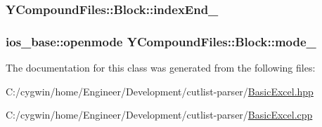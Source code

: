 \subsubsection[{index\+End\+\_\+}]{ Y\+Compound\+Files\+::\+Block\+::index\+End\+\_\+\hspace{0.3cm}{\ttfamily [protected]}}\label{class_y_compound_files_1_1_block_a59d2032750f3b0bc12d0a40fe771d3b4}
\hypertarget{class_y_compound_files_1_1_block_a953138ce3ee54ea63dd75cc61ae17b7f}{}
\subsubsection[{mode\+\_\+}]{\setlength{\rightskip}{0pt plus 5cm}ios\+\_\+base\+::openmode Y\+Compound\+Files\+::\+Block\+::mode\+\_\+\hspace{0.3cm}{\ttfamily [protected]}}\label{class_y_compound_files_1_1_block_a953138ce3ee54ea63dd75cc61ae17b7f}


The documentation for this class was generated from the following files\+:\begin{DoxyCompactItemize}
\item 
C\+:/cygwin/home/\+Engineer/\+Development/cutlist-\/parser/\hyperlink{_basic_excel_8hpp}{Basic\+Excel.\+hpp}\item 
C\+:/cygwin/home/\+Engineer/\+Development/cutlist-\/parser/\hyperlink{_basic_excel_8cpp}{Basic\+Excel.\+cpp}\end{DoxyCompactItemize}
